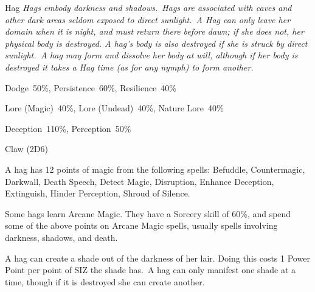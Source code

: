 \newpage

\begin{monsterbox}{Hag}
	\textit{Hags embody darkness and shadows. Hags are associated with caves and other dark areas seldom exposed to direct sunlight. A Hag can only leave her domain when it is night, and must return there before dawn; if she does not, her physical body is destroyed. A hag’s body is also destroyed if she is struck by direct sunlight. A hag may form and dissolve her body at will, although if her body is destroyed it takes a Hag time (as for any nymph) to form another.}\\
	\rpghline
	\basics[%
        hitpoints  = 11, 
	majorwound = 6,
	damagemodifier = +1D6,
	powerpoints = 22,
	movementrate = 15m,
	armor = None,
	plunderrating = 3
	]
	\rpghline%
	\stats[ %
		STR = 6D6    (21),
		CON = 3D6    (11),
		DEX = 3D6    (11),
		SIZ = 3D6    (11),
		INT = 2D6+12 (19),
		POW = 2D6+21 (28),
		CHA = 1D6    (3)
	]
	\rpghline%
	\begin{rpg-monsteraction}[Resistances]
		Dodge~50\%, Persistence~60\%, Resilience~40\%
	\end{rpg-monsteraction}
	\begin{rpg-monsteraction}[Knowledge]
		Lore (Magic)~40\%, Lore (Undead)~40\%, Nature Lore~40\%
	\end{rpg-monsteraction}
	\begin{rpg-monsteraction}[Practical]
		Deception~110\%, Perception~50\%
	\end{rpg-monsteraction}
	\begin{rpg-monsteraction}
		Claw (2D6)
	\end{rpg-monsteraction}
	\begin{rpg-monsteraction}[Magic 75\%]
		A hag has 12 points of magic from the following spells: Befuddle, Countermagic, Darkwall, Death Speech, Detect Magic, Disruption, Enhance Deception, Extinguish, Hinder Perception, Shroud of Silence.
	\end{rpg-monsteraction}
	\begin{rpg-monsteraction}
		Some hags learn Arcane Magic. They have a Sorcery skill of 60\%, and spend some of the above points on Arcane Magic spells, usually spells involving darkness, shadows, and death.
	\end{rpg-monsteraction}
	\begin{rpg-monsteraction}
		A hag can create a shade out of the darkness of her lair. Doing this costs 1 Power Point per point of SIZ the shade has. A hag can only manifest one shade at a time, though if it is destroyed she can create another.
	\end{rpg-monsteraction}

\end{monsterbox}

